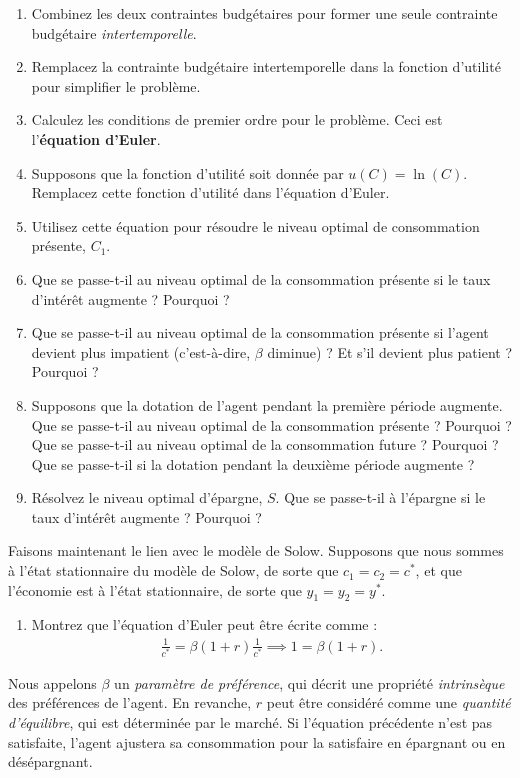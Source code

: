 \documentclass[11pt]{article}
\begin{document}
\begin{enumerate}
    \item Combinez les deux contraintes budgétaires pour former une seule contrainte budgétaire \textit{intertemporelle}.
    \item Remplacez la contrainte budgétaire intertemporelle dans la fonction d'utilité pour simplifier le problème.
    \item Calculez les conditions de premier ordre pour le problème. Ceci est l'\textbf{équation d'Euler}.
    \item Supposons que la fonction d'utilité soit donnée par \(u(C) = \ln(C)\). Remplacez cette fonction d'utilité dans l'équation d'Euler.
    \item Utilisez cette équation pour résoudre le niveau optimal de consommation présente, \(C_1\).
    \item Que se passe-t-il au niveau optimal de la consommation présente si le taux d'intérêt augmente ? Pourquoi ?
    \item Que se passe-t-il au niveau optimal de la consommation présente si l'agent devient plus impatient 
    (c'est-à-dire, \(\beta\) diminue) ? Et s'il devient plus patient ? Pourquoi ?
    \item Supposons que la dotation de l'agent pendant la première période augmente. Que se passe-t-il au niveau optimal de la consommation présente ? Pourquoi ?
    Que se passe-t-il au niveau optimal de la consommation future ? Pourquoi ? Que se passe-t-il si la dotation pendant la deuxième période augmente ?
    \item Résolvez le niveau optimal d'épargne, \(S\). Que se passe-t-il à l'épargne si le taux d'intérêt augmente ? Pourquoi ?
\end{enumerate}

Faisons maintenant le lien avec le modèle de Solow. Supposons que nous sommes à l'état stationnaire du modèle de Solow, de sorte que
\(c_1 = c_2 = c^*\), et que l'économie est à l'état stationnaire, de sorte que \(y_1 = y_2 = y^*\).

\begin{enumerate}[resume]
    \item Montrez que l'équation d'Euler peut être écrite comme :
    \begin{align*}
        \frac{1}{c^*} =
        \beta(1 + r) \frac{1}{c^*} \implies 1 = \beta(1 + r).
    \end{align*} 
\end{enumerate}

Nous appelons \(\beta\) un \textit{paramètre de préférence}, qui décrit une propriété \textit{intrinsèque} des préférences de l'agent.
En revanche, \(r\) peut être considéré comme une \textit{quantité d'équilibre}, qui est déterminée par le marché.
Si l'équation précédente n'est pas satisfaite, l'agent ajustera sa consommation pour la satisfaire en épargnant ou en désépargnant.
\end{document}
